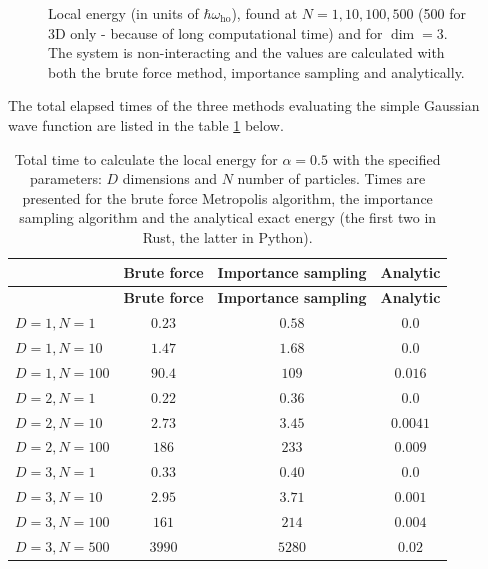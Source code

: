 \documentclass[
]{article}
\begin{document}
\begin{figure}[ht]
  \caption{Local energy (in units of $\hbar\omega_\text{ho}$), found at $N=1,10,100, 500$ (500 for 3D only - because of long computational time)  and for $\dim= 3$. The system is non-interacting and the values are calculated with both the brute force method, importance sampling and analytically.}
  \label{fig:BF_vs_IM_VS_analytical_3D}
\end{figure}

The total elapsed times of the three methods evaluating the simple
Gaussian wave function are listed in the table
\ref{tbl:BF_vs_IM_VS_analytical} below.

\begin{longtable}[]{@{}lccc@{}}
\caption{Total time to calculate the local energy for \(\alpha = 0.5\)
with the specified parameters: \(D\) dimensions and \(N\) number of
particles. Times are presented for the brute force Metropolis algorithm,
the importance sampling algorithm and the analytical exact energy (the
first two in Rust, the latter in Python).
\label{tbl:BF_vs_IM_VS_analytical}}\tabularnewline
\toprule
& \textbf{Brute force} & \textbf{Importance sampling} &
\textbf{Analytic} \\
\midrule
\endfirsthead
\toprule
& \textbf{Brute force} & \textbf{Importance sampling} &
\textbf{Analytic} \\
\midrule
\endhead
\(D=1, N=1\) & \(0.23\) & \(0.58\) & \(0.0\) \\
\(D=1, N=10\) & \(1.47\) & \(1.68\) & \(0.0\) \\
\(D=1, N=100\) & \(90.4\) & \(109\) & \(0.016\) \\
\(D=2, N=1\) & \(0.22\) & \(0.36\) & \(0.0\) \\
\(D=2, N=10\) & \(2.73\) & \(3.45\) & \(0.0041\) \\
\(D=2, N=100\) & \(186\) & \(233\) & \(0.009\) \\
\(D=3, N=1\) & \(0.33\) & \(0.40\) & \(0.0\) \\
\(D=3, N=10\) & \(2.95\) & \(3.71\) & \(0.001\) \\
\(D=3, N=100\) & \(161\) & \(214\) & \(0.004\) \\
\(D=3, N=500\) & \(3990\) & \(5280\) & \(0.02\) \\
\bottomrule
\end{longtable}
\end{document}
